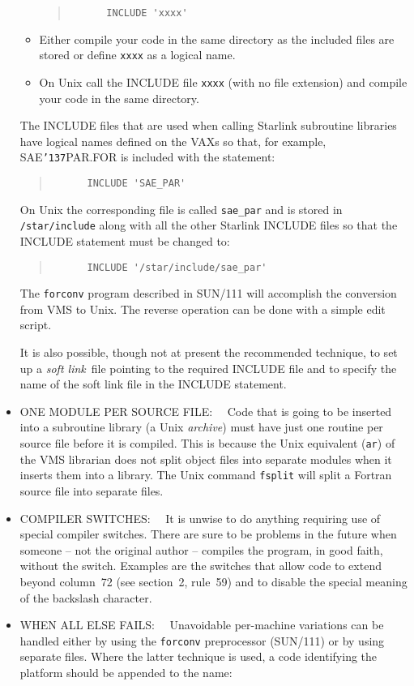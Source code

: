 \documentclass[twoside,11pt]{article}
\renewcommand{\_}{{\tt\char'137}}
\begin{document}
\begin{itemize}
\begin{itemize}
\begin{quote}
\begin{verbatim}
      INCLUDE 'xxxx'
    \end{verbatim}
    \end{quote}
   \item Either compile your code in the same directory as the included files
    are stored or define \verb|xxxx| as a logical name.
   \item On Unix call the INCLUDE file \verb|xxxx| (with no file extension) and
    compile your code in the same directory.
  \end{itemize}
  The INCLUDE files that are used when calling Starlink subroutine
  libraries have logical names defined on the VAXs so that, for example,
  SAE\_PAR.FOR is included with the statement:
    \begin{quote}
    \begin{verbatim}
      INCLUDE 'SAE_PAR'
    \end{verbatim}
    \end{quote}
  On Unix the corresponding file is called \verb|sae_par| and is stored in
  \verb|/star/include| along with all the other Starlink INCLUDE files so that
  the INCLUDE statement must be changed to:
    \begin{quote}
    \begin{verbatim}
      INCLUDE '/star/include/sae_par'
    \end{verbatim}
    \end{quote}
  The \verb|forconv| program
  described in SUN/111 will accomplish the conversion from VMS
  to Unix. The reverse operation can be done with a simple edit script.

  It is also possible, though not at present the recommended
  technique, to set up a {\it soft link}\, file pointing to the required
  INCLUDE file and to specify the name of the soft link file in
  the INCLUDE statement.
 \item ONE MODULE PER SOURCE FILE:~~
  Code that is going to be inserted into a subroutine library (a Unix
  {\it archive}) must have just one routine per source file before it is
  compiled.  This is because the Unix equivalent (\verb|ar|) of the VMS
  librarian does not split object files into separate modules when it inserts
  them into a library.  The Unix command \verb|fsplit| will split a Fortran
  source file into separate files.
 \item COMPILER SWITCHES:~~
  It is unwise to do anything requiring use of special compiler
  switches.  There are sure to be problems in the future when someone --
  not the original author -- compiles the program, in good faith,
  without the switch.  Examples are the switches that allow code
  to extend beyond column~72 (see section~2, rule~59) and
  to disable the special meaning of the backslash character.
 \item WHEN ALL ELSE FAILS:~~
   Unavoidable per-machine variations can be handled either by using the
   \verb|forconv| preprocessor (SUN/111) or by using separate files.
   Where the latter technique is used, a code identifying the platform
   should be appended to the name:


\end{itemize}
\end{document}
